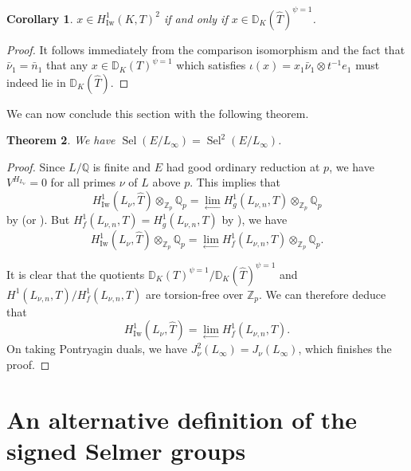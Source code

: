 \documentclass{amsart}
\newcommand{\QQ}{\mathbb Q}
\newcommand{\ZZ}{\mathbb Z}
\newcommand{\DD}{\mathbb D}
\DeclareMathOperator{\Sel}{Sel}
\DeclareMathOperator{\Iw}{Iw}
\newcommand{\Qp}{\QQ_p}
\newcommand{\Zp}{\ZZ_p}
\newtheorem{theorem}{Theorem}[section]
\newtheorem{corollary}[theorem]{Corollary}
\begin{document}
   \begin{corollary}
    $x\in H^1_{\Iw}(K,T)^2$ if and only if $x\in \DD_{K}(\hat{T})^{\psi=1}$.
   \end{corollary}
   \begin{proof}
    It follows immediately from the comparison isomorphism and the fact that $\bar{\nu}_1=\bar{n}_1$ that any $x\in\DD_{K}(T)^{\psi=1}$ which satisfies $\iota(x)=x_1\bar{\nu}_1\otimes t^{-1}e_1$ must indeed lie in $\DD_{K}(\hat{T})$.
   \end{proof}
         
   We can now conclude this section with the following theorem.
   
   \begin{theorem}\label{sameSelmergroup}
    We have $\Sel(E\slash L_\infty)=\Sel^2(E\slash L_\infty)$. 
   \end{theorem}
   \begin{proof}
    Since $L/\QQ$ is finite and $E$ had good ordinary reduction at $p$, we have $V^{H_{L_\nu}}=0$ for all primes $\nu$ of $L$ above $p$. This implies that 
    \[
     H^1_{\Iw}(L_\nu,\hat{T})\otimes_{\Zp}\Qp=\lim_{\leftarrow} H^1_g(L_{\nu,n},T)\otimes_{\Zp}\Qp
    \]
    by \cite[Proposition~0.1]{perrinriou00a} (or \cite[Theorem~A]{berger05}). But $H^1_f(L_{\nu,n},T)=H^1_g(L_{\nu,n},T)$ by \cite[(3.11.2)]{blochkato90}), we have 
    \[
     H^1_{\Iw}(L_\nu,\hat{T})\otimes_{\Zp}\Qp=\lim_{\leftarrow} H^1_f(L_{\nu,n},T)\otimes_{\Zp}\Qp.
    \]
     
    It is clear that the quotients $\DD_K(T)^{\psi=1}\slash\DD_{K}(\hat{T})^{\psi=1}$ and $H^1(L_{\nu,n},T)\slash H^1_f(L_{\nu,n},T)$ are torsion-free over $\Zp$. We can therefore deduce that 
    \[
     H^1_{\Iw}(L_\nu,\hat{T})=\lim_{\leftarrow} H^1_f(L_{\nu,n},T).
    \]
    On taking Pontryagin duals, we have $J_\nu^2(L_\infty)=J_\nu(L_\infty)$, which finishes the proof.
   \end{proof}    





\section{An alternative definition of the signed Selmer groups}\label{alter}
\end{document}
